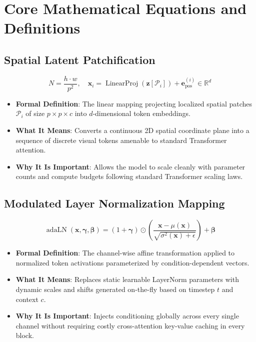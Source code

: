 \documentclass[11pt,a4paper]{article}
\theoremstyle{definition}
\begin{document}
\section{Core Mathematical Equations and Definitions}

\subsection{Spatial Latent Patchification}
{\boldmath
\begin{equation}
N = \frac{h \cdot w}{p^2}, \quad \mathbf{x}_i = \operatorname{LinearProj}\left( \mathbf{z}\left[ \mathcal{P}_i \right] \right) + \mathbf{e}_{\text{pos}}^{(i)} \in \mathbb{R}^d
\end{equation}
}
\begin{itemize}
    \item \textbf{Formal Definition}: The linear mapping projecting localized spatial patches $\mathcal{P}_i$ of size $p \times p \times c$ into $d$-dimensional token embeddings.
    \item \textbf{What It Means}: Converts a continuous 2D spatial coordinate plane into a sequence of discrete visual tokens amenable to standard Transformer attention.
    \item \textbf{Why It Is Important}: Allows the model to scale cleanly with parameter counts and compute budgets following standard Transformer scaling laws.
\end{itemize}

\subsection{Modulated Layer Normalization Mapping}
{\boldmath
\begin{equation}
\operatorname{adaLN}(\mathbf{x}, \boldsymbol{\gamma}, \boldsymbol{\beta}) = (1 + \boldsymbol{\gamma}) \odot \left( \frac{\mathbf{x} - \mu(\mathbf{x})}{\sqrt{\sigma^2(\mathbf{x}) + \epsilon}} \right) + \boldsymbol{\beta}
\end{equation}
}
\begin{itemize}
    \item \textbf{Formal Definition}: The channel-wise affine transformation applied to normalized token activations parameterized by condition-dependent vectors.
    \item \textbf{What It Means}: Replaces static learnable LayerNorm parameters with dynamic scales and shifts generated on-the-fly based on timestep $t$ and context $c$.
    \item \textbf{Why It Is Important}: Injects conditioning globally across every single channel without requiring costly cross-attention key-value caching in every block.
\end{itemize}
\end{document}
